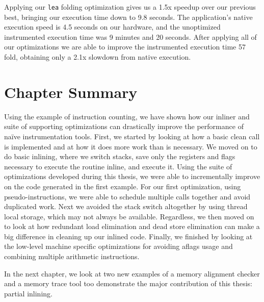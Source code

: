 Applying our {\tt lea} folding optimization gives us a 1.5x speedup over our
previous best, bringing our execution time down to 9.8 seconds.  The
application's native execution speed is 4.5 seconds on our hardware, and the
unoptimized instrumented execution time was 9 minutes and 20 seconds.  After
applying all of our optimizations we are able to improve the instrumented
execution time 57 fold, obtaining only a 2.1x slowdown from native execution.

\section{Chapter Summary}

Using the example of instruction counting, we have shown how our inliner and
suite of supporting optimizations can drastically improve the performance of
na\"ive instrumentation tools.  First, we started by looking at how a basic
clean call is implemented and at how it does more work than is necessary.  We
moved on to do basic inlining, where we switch stacks, save only the registers
and flags necessary to execute the routine inline, and execute it.  Using the
suite of optimizations developed during this thesis, we were able to
incrementally improve on the code generated in the first example.  For our first
optimization, using pseudo-instructions, we were able to schedule multiple calls
together and avoid duplicated work.  Next we avoided the stack switch altogether
by using thread local storage, which may not always be available.  Regardless,
we then moved on to look at how redundant load elimination and dead store
elimination can make a big difference in cleaning up our inlined code.  Finally,
we finished by looking at the low-level machine specific optimizations for
avoiding aflags usage and combining multiple arithmetic instructions.

In the next chapter, we look at two new examples of a memory alignment checker
and a memory trace tool too demonstrate the major contribution of this thesis:
partial inlining.
